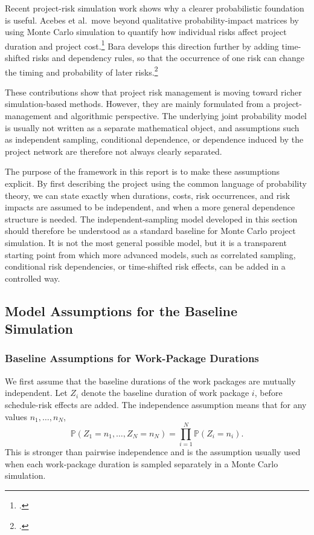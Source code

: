 \documentclass[11pt,a4paper]{article}
\newcommand{\pP}{\mathbb{P}}
\newcommand{\1}{\mathbf{1}}
\theoremstyle{definition}
\theoremstyle{plain}
\theoremstyle{remark}
\numberwithin{equation}{section}
\begin{document}
Recent project-risk simulation work shows why a clearer probabilistic foundation is useful. Acebes et al.\ move beyond qualitative probability-impact matrices by using Monte Carlo simulation to quantify how individual risks affect project duration and project cost.\footcite{acebes2024beyondProbabilityImpactMatrices} Bara develops this direction further by adding time-shifted risks and dependency rules, so that the occurrence of one risk can change the timing and probability of later risks.\footcite{bara2025enhanced}

These contributions show that project risk management is moving toward richer simulation-based methods. However, they are mainly formulated from a project-management and algorithmic perspective. The underlying joint probability model is usually not written as a separate mathematical object, and assumptions such as independent sampling, conditional dependence, or dependence induced by the project network are therefore not always clearly separated.

The purpose of the framework in this report is to make these assumptions explicit. By first describing the project using the common language of probability theory, we can state exactly when durations, costs, risk occurrences, and risk impacts are assumed to be independent, and when a more general dependence structure is needed. The independent-sampling model developed in this section should therefore be understood as a standard baseline for Monte Carlo project simulation. It is not the most general possible model, but it is a transparent starting point from which more advanced models, such as correlated sampling, conditional risk dependencies, or time-shifted risk effects, can be added in a controlled way.

\newpage

\subsection{Model Assumptions for the Baseline Simulation}

\subsubsection{Baseline Assumptions for Work-Package Durations}

We first assume that the baseline durations of the work packages are mutually independent. Let $Z_i$ denote the baseline duration of work package $i$, before schedule-risk effects are added. The independence assumption means that for any values $n_1,\ldots,n_N$,
\[
\pP(Z_1=n_1,\ldots,Z_N=n_N)
=
\prod_{i=1}^N \pP(Z_i=n_i).
\]
This is stronger than pairwise independence and is the assumption usually used when each work-package duration is sampled separately in a Monte Carlo simulation.
\end{document}
